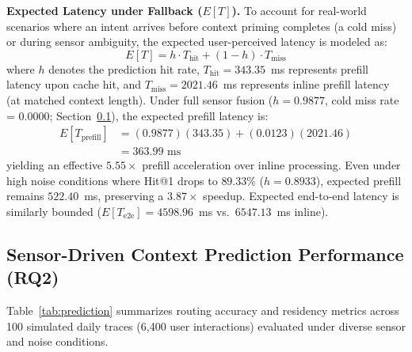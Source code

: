 \documentclass[journal]{IEEEtran}
\begin{document}
\textbf{Expected Latency under Fallback ($E[T]$).} To account for real-world scenarios where an intent arrives before context priming completes (a cold miss) or during sensor ambiguity, the expected user-perceived latency is modeled as:
\begin{equation}
E[T] = h \cdot T_{\text{hit}} + (1 - h) \cdot T_{\text{miss}}
\label{eq:expected_latency}
\end{equation}
where $h$ denotes the prediction hit rate, $T_{\text{hit}} = 343.35$~ms represents prefill latency upon cache hit, and $T_{\text{miss}} = 2021.46$~ms represents inline prefill latency (at matched context length). Under full sensor fusion ($h = 0.9877$, cold miss rate = 0.0000; Section~\ref{sec:results_prediction}), the expected prefill latency is:
\begin{align*}
E[T_{\text{prefill}}] &= (0.9877)(343.35) + (0.0123)(2021.46) \\
&= 363.99\text{ ms}
\end{align*}
yielding an effective $5.55\times$ prefill acceleration over inline processing. Even under high noise conditions where Hit@1 drops to $89.33\%$ ($h = 0.8933$), expected prefill remains $522.40$~ms, preserving a $3.87\times$ speedup. Expected end-to-end latency is similarly bounded ($E[T_{\text{e2e}}] = 4598.96$~ms vs.\ $6547.13$~ms inline).

\subsection{Sensor-Driven Context Prediction Performance (RQ2)}
\label{sec:results_prediction}

Table~\ref{tab:prediction} summarizes routing accuracy and residency metrics across 100 simulated daily traces (6,400 user interactions) evaluated under diverse sensor and noise conditions.
\end{document}

